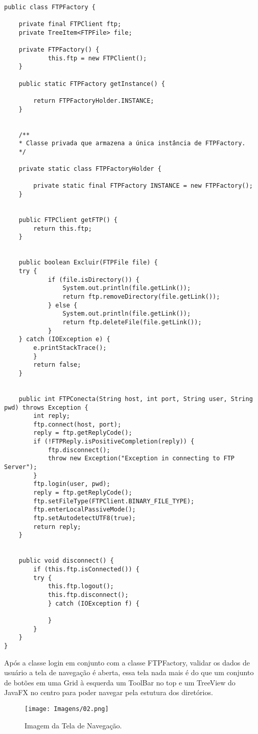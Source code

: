 \documentclass[12pt]{article}
\begin{document}
\begin{lstlisting}

public class FTPFactory {
	
	private final FTPClient ftp;
	private TreeItem<FTPFile> file;
		
	private FTPFactory() {
			this.ftp = new FTPClient();
	}
	
	public static FTPFactory getInstance() {
	
		return FTPFactoryHolder.INSTANCE;
	}


	/**
	* Classe privada que armazena a única instância de FTPFactory.
	*/
	
	private static class FTPFactoryHolder {
	
		private static final FTPFactory INSTANCE = new FTPFactory();
	}


	public FTPClient getFTP() {
		return this.ftp;
	}


	public boolean Excluir(FTPFile file) {
	try {
			if (file.isDirectory()) {
				System.out.println(file.getLink());
				return ftp.removeDirectory(file.getLink());
			} else {
				System.out.println(file.getLink());
				return ftp.deleteFile(file.getLink());
			}
	} catch (IOException e) {
		e.printStackTrace();
		}	
		return false;
	}


	public int FTPConecta(String host, int port, String user, String pwd) throws Exception {
		int reply;
		ftp.connect(host, port);
		reply = ftp.getReplyCode();
		if (!FTPReply.isPositiveCompletion(reply)) {
			ftp.disconnect();
			throw new Exception("Exception in connecting to FTP Server");
		}
		ftp.login(user, pwd);
		reply = ftp.getReplyCode();
		ftp.setFileType(FTPClient.BINARY_FILE_TYPE);
		ftp.enterLocalPassiveMode();
		ftp.setAutodetectUTF8(true);
		return reply;
	}


	public void disconnect() {
		if (this.ftp.isConnected()) {
		try {
			this.ftp.logout();
			this.ftp.disconnect();
			} catch (IOException f) {
	
			}
	    }
	}
}	

\end{lstlisting}

Após a classe login em conjunto com a classe FTPFactory, validar os dados de usuário a tela de navegação é aberta, essa tela nada mais é do que um conjunto de botões em uma Grid à esquerda um ToolBar no top e um TreeView do JavaFX no centro para poder navegar pela estutura dos diretórios.

\begin{figure}[H]
	\centering
	\texttt{[image: Imagens/02.png]}
	\caption{ Imagem da Tela de Navegação.}
	\label{fig:03}
\end{figure}
\end{document}
